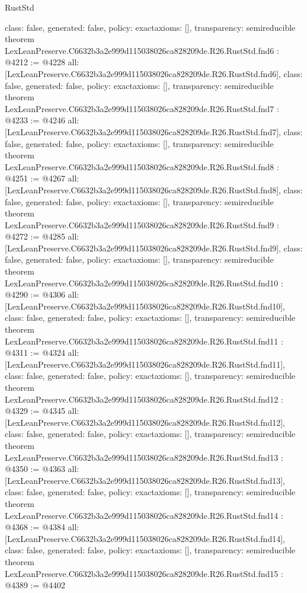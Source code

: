 \begin{lexlean}{RustStd}
\begin{coremodule}
{  class: false,
  generated: false,
  policy: exact{axioms: []},
  transparency: semireducible
}
theorem LexLeanPreserve.C6632b3a2e999d115038026ca828209de.R26.RustStd.fnd6 : @4212 := @4228 {
  all: [LexLeanPreserve.C6632b3a2e999d115038026ca828209de.R26.RustStd.fnd6],
  class: false,
  generated: false,
  policy: exact{axioms: []},
  transparency: semireducible
}
theorem LexLeanPreserve.C6632b3a2e999d115038026ca828209de.R26.RustStd.fnd7 : @4233 := @4246 {
  all: [LexLeanPreserve.C6632b3a2e999d115038026ca828209de.R26.RustStd.fnd7],
  class: false,
  generated: false,
  policy: exact{axioms: []},
  transparency: semireducible
}
theorem LexLeanPreserve.C6632b3a2e999d115038026ca828209de.R26.RustStd.fnd8 : @4251 := @4267 {
  all: [LexLeanPreserve.C6632b3a2e999d115038026ca828209de.R26.RustStd.fnd8],
  class: false,
  generated: false,
  policy: exact{axioms: []},
  transparency: semireducible
}
theorem LexLeanPreserve.C6632b3a2e999d115038026ca828209de.R26.RustStd.fnd9 : @4272 := @4285 {
  all: [LexLeanPreserve.C6632b3a2e999d115038026ca828209de.R26.RustStd.fnd9],
  class: false,
  generated: false,
  policy: exact{axioms: []},
  transparency: semireducible
}
theorem LexLeanPreserve.C6632b3a2e999d115038026ca828209de.R26.RustStd.fnd10 : @4290 := @4306 {
  all: [LexLeanPreserve.C6632b3a2e999d115038026ca828209de.R26.RustStd.fnd10],
  class: false,
  generated: false,
  policy: exact{axioms: []},
  transparency: semireducible
}
theorem LexLeanPreserve.C6632b3a2e999d115038026ca828209de.R26.RustStd.fnd11 : @4311 := @4324 {
  all: [LexLeanPreserve.C6632b3a2e999d115038026ca828209de.R26.RustStd.fnd11],
  class: false,
  generated: false,
  policy: exact{axioms: []},
  transparency: semireducible
}
theorem LexLeanPreserve.C6632b3a2e999d115038026ca828209de.R26.RustStd.fnd12 : @4329 := @4345 {
  all: [LexLeanPreserve.C6632b3a2e999d115038026ca828209de.R26.RustStd.fnd12],
  class: false,
  generated: false,
  policy: exact{axioms: []},
  transparency: semireducible
}
theorem LexLeanPreserve.C6632b3a2e999d115038026ca828209de.R26.RustStd.fnd13 : @4350 := @4363 {
  all: [LexLeanPreserve.C6632b3a2e999d115038026ca828209de.R26.RustStd.fnd13],
  class: false,
  generated: false,
  policy: exact{axioms: []},
  transparency: semireducible
}
theorem LexLeanPreserve.C6632b3a2e999d115038026ca828209de.R26.RustStd.fnd14 : @4368 := @4384 {
  all: [LexLeanPreserve.C6632b3a2e999d115038026ca828209de.R26.RustStd.fnd14],
  class: false,
  generated: false,
  policy: exact{axioms: []},
  transparency: semireducible
}
theorem LexLeanPreserve.C6632b3a2e999d115038026ca828209de.R26.RustStd.fnd15 : @4389 := @4402 {
}
\end{coremodule}
\end{lexlean}
